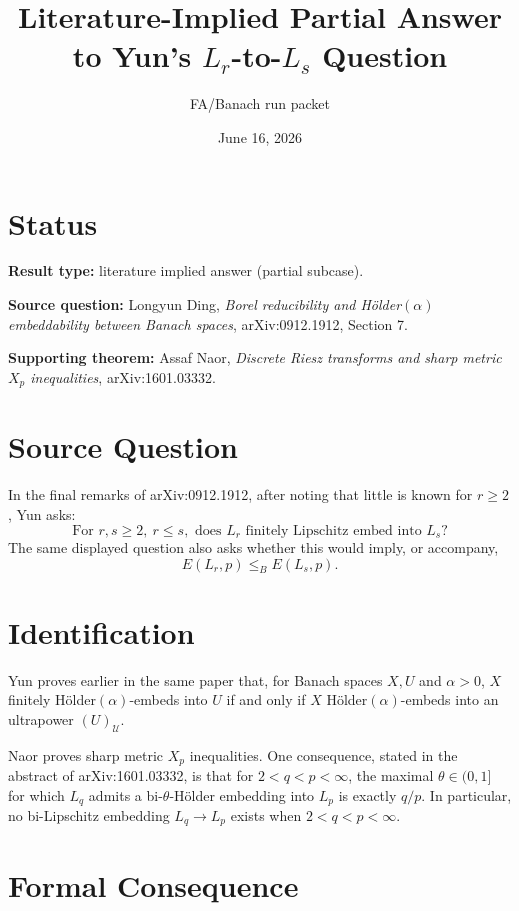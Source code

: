 \documentclass[11pt]{article}
\title{Literature-Implied Partial Answer to Yun's \(L_r\)-to-\(L_s\) Question}
\author{FA/Banach run packet}
\date{June 16, 2026}
\begin{document}
\maketitle

\section*{Status}

\textbf{Result type:} literature implied answer (partial subcase).

\textbf{Source question:} Longyun Ding, \emph{Borel reducibility and
H\"older\((\alpha)\) embeddability between Banach spaces}, arXiv:0912.1912,
Section 7.

\textbf{Supporting theorem:} Assaf Naor, \emph{Discrete Riesz transforms and
sharp metric \(X_p\) inequalities}, arXiv:1601.03332.

\section*{Source Question}

In the final remarks of arXiv:0912.1912, after noting that little is known for
\(r\ge 2\), Yun asks:
\[
\text{For } r,s\ge 2,\ r\le s,\text{ does } L_r \text{ finitely Lipschitz
embed into } L_s?
\]
The same displayed question also asks whether this would imply, or accompany,
\[
E(L_r,p)\le_B E(L_s,p).
\]

\section*{Identification}

Yun proves earlier in the same paper that, for Banach spaces \(X,U\) and
\(\alpha>0\), \(X\) finitely H\"older\((\alpha)\)-embeds into \(U\) if and only
if \(X\) H\"older\((\alpha)\)-embeds into an ultrapower \((U)_{\mathcal U}\).

Naor proves sharp metric \(X_p\) inequalities. One consequence, stated in the
abstract of arXiv:1601.03332, is that for \(2<q<p<\infty\), the maximal
\(\theta\in(0,1]\) for which \(L_q\) admits a bi-\(\theta\)-H\"older embedding
into \(L_p\) is exactly \(q/p\). In particular, no bi-Lipschitz embedding
\(L_q\to L_p\) exists when \(2<q<p<\infty\).

\section*{Formal Consequence}
\end{document}
